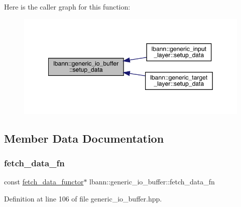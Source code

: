 Here is the caller graph for this function\+:\nopagebreak
\begin{figure}[H]
\begin{center}
\leavevmode
\includegraphics[width=349pt]{classlbann_1_1generic__io__buffer_a00f3920147f7f19eceb5336bd6ddb421_icgraph}
\end{center}
\end{figure}


\subsection{Member Data Documentation}
\mbox{\label{classlbann_1_1generic__io__buffer_a267170b4fd11dc60c782a9cb2b7b06cc}} 
\subsubsection{\texorpdfstring{fetch\+\_\+data\+\_\+fn}{fetch\_data\_fn}}
{\footnotesize\ttfamily const \hyperlink{classlbann_1_1fetch__data__functor}{fetch\+\_\+data\+\_\+functor}$\ast$ lbann\+::generic\+\_\+io\+\_\+buffer\+::fetch\+\_\+data\+\_\+fn}



Definition at line 106 of file generic\+\_\+io\+\_\+buffer.\+hpp.

\mbox{\label{classlbann_1_1generic__io__buffer_a2e4a46c85c8b30e10b1cc5acaa2c4cca}} 
